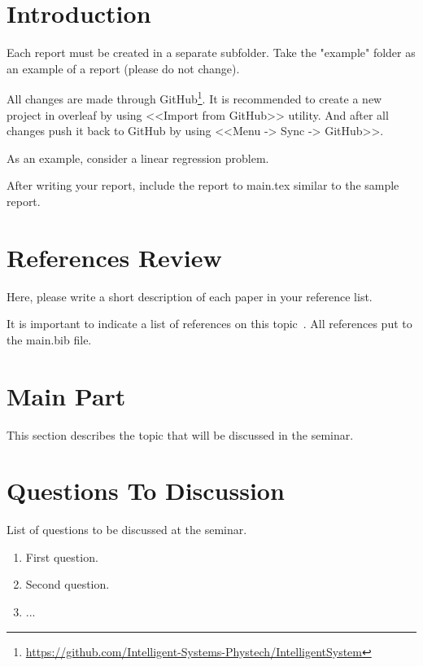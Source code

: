 \section{Introduction}

Each report must be created in a separate subfolder. Take the "example" folder as an example of a report (please do not change).

All changes are made through GitHub\footnote{\url{https://github.com/Intelligent-Systems-Phystech/IntelligentSystem}}. It is recommended to create a new project in overleaf by using <<Import from GitHub>> utility. And after all changes push it back to GitHub by using <<Menu -> Sync -> GitHub>>.

As an example, consider a linear regression problem.


After writing your report, include the report to main.tex similar to the sample report.

\section{References Review}

Here, please write a short description of each paper in your reference list.

It is important to indicate a list of references on this topic~\cite{AuthorYear}. All references put to the main.bib file.


\section{Main Part}

This section describes the topic that will be discussed in the seminar.

\section{Questions To Discussion}
List of questions to be discussed at the seminar.
\begin{enumerate}
    \item First question.
    \item Second question.
    \item ...
\end{enumerate}